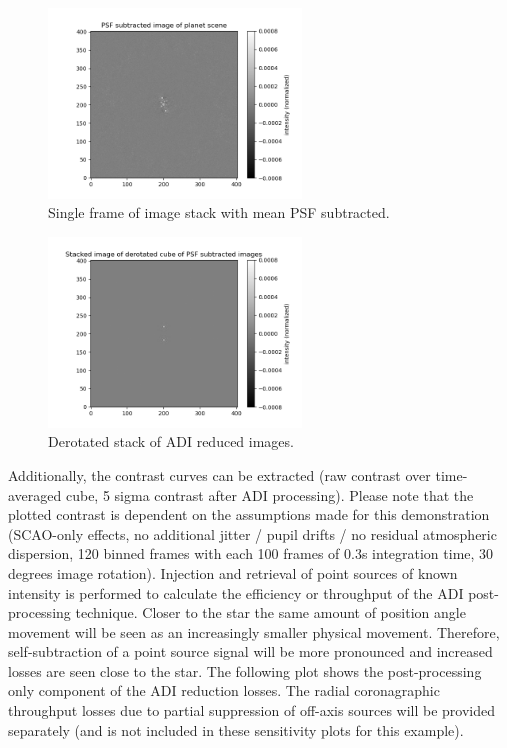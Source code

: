 \begin{figure}[!ht]
  \centering
  \includegraphics[width=0.6\textwidth]{./figures/adi_meansub.png}
  \caption{Single frame of image stack with mean PSF subtracted.}
\end{figure}

\begin{figure}[!ht]
  \centering
  \includegraphics[width=0.6\textwidth]{./figures/adi_derotstack.png}
  \caption{Derotated stack of ADI reduced images.}
\end{figure}

Additionally, the contrast curves can be extracted (raw contrast over time-averaged cube, 5 sigma contrast after ADI processing). Please note that the plotted contrast is dependent on the assumptions made for this demonstration (SCAO-only effects, no additional jitter / pupil drifts / no residual atmospheric dispersion, 120 binned frames with each 100 frames of 0.3s integration time, 30 degrees image rotation). 
Injection and retrieval of point sources of known intensity is performed to calculate the efficiency or throughput of the ADI post-processing technique. Closer to the star the same amount of position angle movement will be seen as an increasingly smaller physical movement. Therefore, self-subtraction of a point source signal will be more pronounced and increased losses are seen close to the star. The following plot shows the post-processing only component of the ADI reduction losses. The radial coronagraphic throughput losses due to partial suppression of off-axis sources will be provided separately (and is not included in these sensitivity plots for this example).



